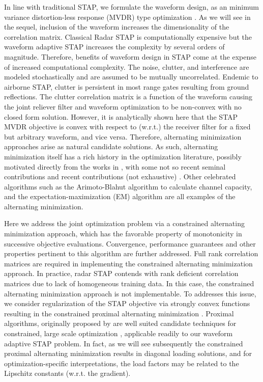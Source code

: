 \documentclass[11pt,draftclsnofoot,onecolumn]{IEEEtran}
\theoremstyle{definition}
\theoremstyle{remark}
\begin{document}
In line with traditional STAP, we formulate the waveform design, as an minimum variance distortion-less response (MVDR) type optimization \cite{capon1969}. As we will see in the sequel, inclusion of the waveform increases the dimensionality of the  correlation matrix. Classical Radar STAP is computationally expensive but the waveform adaptive STAP increases the complexity by several orders of magnitude. Therefore, benefits of waveform design in STAP come at the expense of increased computational complexity. The noise, clutter, and interference are modeled stochastically and are assumed to be mutually uncorrelated. Endemic to airborne STAP, clutter is persistent in most range gates resulting from ground reflections. The clutter correlation matrix is a function of the waveform causing the joint reliever filter and waveform optimization to be non-convex with no closed form solution. However, it is analytically shown here that the STAP MVDR objective is convex with respect to (w.r.t.) the receiver filter for a fixed but arbitrary waveform, and vice versa. Therefore, alternating minimization approaches arise as natural candidate solutions. As such, alternating minimization itself has a rich history in the optimization literature, possibly motivated directly from the works in \cite{Powell1964,Powell1973,Zangwill1967,Ortega1970}, with some not so recent seminal contributions \cite{Luo1992, Auslender1992, Bertsekas1999,Grippo2000} and recent contributions (not exhaustive) \cite{Attouch2010,Beck2013}. Other celebrated algorithms such as the Arimoto-Blahut algorithm to calculate channel capacity, and the expectation-maximization (EM) algorithm are all examples of the alternating minimization.

Here we address the joint optimization problem via a constrained alternating minimization approach, which has the favorable property of monotonicity in successive objective evaluations. Convergence, performance guarantees and other properties pertinent to this algorithm are further addressed. Full rank correlation matrices are required in implementing the constrained alternating minimization approach. In practice, radar STAP contends with rank deficient correlation matrices due to lack of homogeneous training data. In this case, the constrained alternating minimization approach is not implementable. To addresses this issue, we consider regularization of the STAP objective via strongly convex functions resulting in the constrained proximal alternating minimization \cite{Setlurasilomar2014}. Proximal algorithms, originally proposed by \cite{Martinet1970,Rockafeller1973} are well suited candidate techniques for constrained, large scale optimization
\cite{Attouch2010,Bertsekas1994,Rockafeller1976,Combettes2011,
Parikh2013}, applicable readily to our waveform adaptive STAP problem. In fact, as we will see subsequently the constrained proximal alternating minimization results in diagonal loading solutions, and for optimization-specific interpretations, the  load factors may be related to the Lipschitz constants (w.r.t. the gradient).
\end{document}
